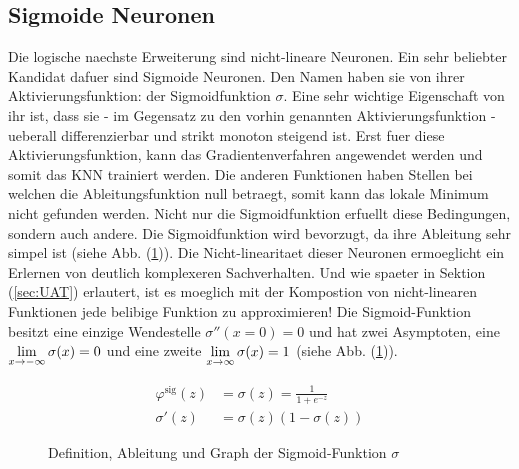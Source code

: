 \subsection{Sigmoide Neuronen}
Die logische naechste Erweiterung sind nicht-lineare Neuronen.
Ein sehr beliebter Kandidat dafuer sind Sigmoide Neuronen.
Den Namen haben sie von ihrer Aktivierungsfunktion: der Sigmoidfunktion $\sigma$.
Eine sehr wichtige Eigenschaft von ihr ist, dass sie - im Gegensatz zu den vorhin
genannten Aktivierungsfunktion - ueberall differenzierbar und strikt monoton
steigend ist. Erst fuer diese Aktivierungsfunktion, kann das Gradientenverfahren
angewendet werden und somit das KNN trainiert werden. Die anderen
Funktionen haben Stellen bei welchen die Ableitungsfunktion null
betraegt, somit kann das lokale Minimum nicht gefunden werden.
\para{}
Nicht nur die Sigmoidfunktion erfuellt diese Bedingungen, sondern auch andere. Die Sigmoidfunktion wird
bevorzugt, da ihre Ableitung sehr simpel ist (siehe Abb. (\ref{fig:sigmoid})).
Die Nicht-linearitaet dieser Neuronen ermoeglicht ein Erlernen von deutlich komplexeren Sachverhalten.
Und wie spaeter in Sektion (\ref{sec:UAT}) erlautert, ist es moeglich mit der Kompostion von nicht-linearen
Funktionen jede belibige Funktion zu approximieren!
\para{}
Die Sigmoid-Funktion besitzt eine einzige Wendestelle $\sigma''(x=0)=0$ und hat
zwei Asymptoten, eine $\displaystyle\lim_{x \to -\infty} \sigma(x)=0$
und eine zweite $\displaystyle\lim_{x \to \infty} \sigma(x)=1$ (siehe Abb. (\ref{fig:sigmoid})).
\\
\begin{figure}[h!]
  \begin{minipage}[h!]{0.5\textwidth}
    \begin{align*}
      \varphi^{\text{sig}}(z) &= \sigma(z) = \frac{1}{1 + e^{-z}}\\
      \sigma'(z)&=\sigma(z)(1-\sigma(z))
    \end{align*}
  \end{minipage}
  \begin{minipage}[h!]{0.5\textwidth}
    \centering
  \end{minipage}
  \caption{Definition, Ableitung und Graph der Sigmoid-Funktion $\sigma$}
  \label{fig:sigmoid}
\end{figure}


